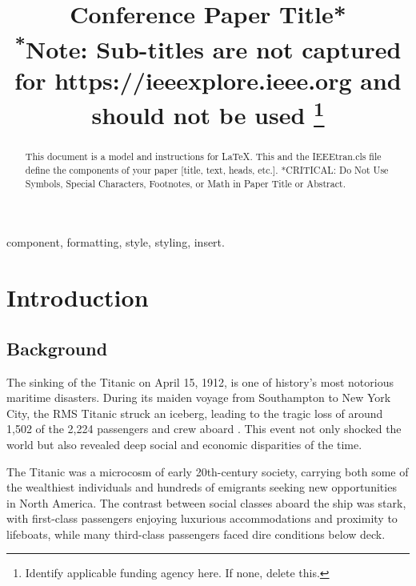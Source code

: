 \documentclass[conference]{IEEEtran}
\begin{document}
\title{Conference Paper Title*\\
{\footnotesize \textsuperscript{*}Note: Sub-titles are not captured for https://ieeexplore.ieee.org  and
should not be used}
\thanks{Identify applicable funding agency here. If none, delete this.}
}

\author{
\and
{}
\and
{}
}

\maketitle

\begin{abstract}
This document is a model and instructions for \LaTeX.
This and the IEEEtran.cls file define the components of your paper [title, text, heads, etc.]. *CRITICAL: Do Not Use Symbols, Special Characters, Footnotes, 
or Math in Paper Title or Abstract.
\end{abstract}

\begin{IEEEkeywords}
component, formatting, style, styling, insert.
\end{IEEEkeywords}

\section{Introduction}

\subsection{Background}

The sinking of the Titanic on April 15, 1912, is one of history's most notorious maritime disasters. During its maiden voyage from Southampton to New York City, the RMS Titanic struck an iceberg, leading to the tragic loss of around 1,502 of the 2,224 passengers and crew aboard \cite{kaggleTitanicMachine}. This event not only shocked the world but also revealed deep social and economic disparities of the time.

The Titanic was a microcosm of early 20th-century society, carrying both some of the wealthiest individuals and hundreds of emigrants seeking new opportunities in North America.\cite{wiki:Titanic} The contrast between social classes aboard the ship was stark, with first-class passengers enjoying luxurious accommodations and proximity to lifeboats, while many third-class passengers faced dire conditions below deck.
\end{document}
